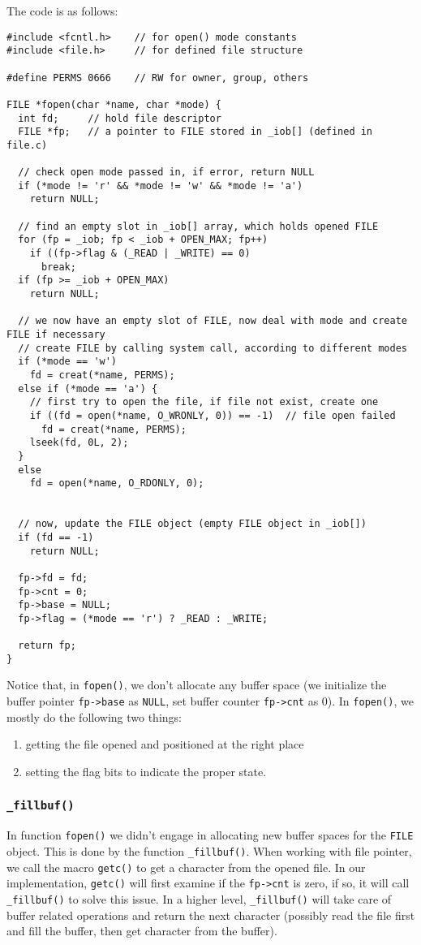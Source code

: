 \documentclass[12pt]{article}
\begin{document}
The code is as follows:
\begin{verbatim}
#include <fcntl.h>    // for open() mode constants
#include <file.h>     // for defined file structure

#define PERMS 0666    // RW for owner, group, others

FILE *fopen(char *name, char *mode) {
  int fd;     // hold file descriptor
  FILE *fp;   // a pointer to FILE stored in _iob[] (defined in file.c)

  // check open mode passed in, if error, return NULL 
  if (*mode != 'r' && *mode != 'w' && *mode != 'a')
    return NULL;

  // find an empty slot in _iob[] array, which holds opened FILE
  for (fp = _iob; fp < _iob + OPEN_MAX; fp++)
    if ((fp->flag & (_READ | _WRITE) == 0)
      break;
  if (fp >= _iob + OPEN_MAX)
    return NULL;

  // we now have an empty slot of FILE, now deal with mode and create FILE if necessary
  // create FILE by calling system call, according to different modes
  if (*mode == 'w')
    fd = creat(*name, PERMS);
  else if (*mode == 'a') {
    // first try to open the file, if file not exist, create one
    if ((fd = open(*name, O_WRONLY, 0)) == -1)  // file open failed
      fd = creat(*name, PERMS);
    lseek(fd, 0L, 2);
  }
  else
    fd = open(*name, O_RDONLY, 0);


  // now, update the FILE object (empty FILE object in _iob[])
  if (fd == -1)
    return NULL;

  fp->fd = fd;
  fp->cnt = 0;
  fp->base = NULL;
  fp->flag = (*mode == 'r') ? _READ : _WRITE;

  return fp;
}
\end{verbatim}

Notice that, in \texttt{fopen()}, we don't allocate any buffer space (we initialize the buffer pointer \texttt{fp->base}  as \texttt{NULL}, set buffer counter \texttt{fp->cnt} as 0). In \texttt{fopen()}, we mostly do the following two things:
\begin{enumerate}
\item getting the file opened and positioned at the right place
\item setting the flag bits to indicate the proper state.
\end{enumerate}
\subsubsection{\texttt{\_fillbuf()}}
\label{sec:org9ff0d94}
In function \texttt{fopen()} we didn't engage in allocating new buffer spaces for the \texttt{FILE} object. This is done by the function \texttt{\_fillbuf()}. When working with file pointer, we call the macro \texttt{getc()} to get a character from the opened file. In our implementation, \texttt{getc()} will first examine if the \texttt{fp->cnt} is zero, if so, it will call \texttt{\_fillbuf()} to solve this issue. In a higher level, \texttt{\_fillbuf()} will take care of buffer related operations and return the next character (possibly read the file first and fill the buffer, then get character from the buffer).
\end{document}
